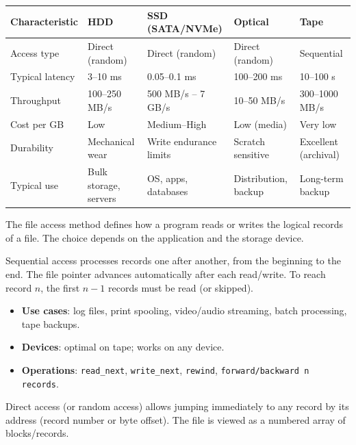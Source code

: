 \documentclass[11pt]{article}
\newcommand{\cle}[1]{{\popxbold\color{popdark}#1}}
\newcounter{popsec}
\newcounter{popsub}
\newcommand{\courssub}[1]{%
  \stepcounter{popsub}%
  \par\vspace{9pt}\noindent{\popxbold\fontsize{11.5}{13}\selectfont\color{popink}{\color{poporange}\thepopsec.\thepopsub}\hspace{6pt}#1}\par\nopagebreak\vspace{4pt}
}
\begin{document}
\begin{center}
\begin{tabularx}{\linewidth}{|l|X|X|X|X|}
\hline
\rowcolor{popblueL} \textbf{Characteristic} & \textbf{HDD} & \textbf{SSD (SATA/NVMe)} & \textbf{Optical} & \textbf{Tape} \\
\hline
Access type & Direct (random) & Direct (random) & Direct (random) & Sequential \\
\hline
Typical latency & 3–10 ms & 0.05–0.1 ms & 100–200 ms & 10–100 s \\
\hline
Throughput & 100–250 MB/s & 500 MB/s – 7 GB/s & 10–50 MB/s & 300–1000 MB/s \\
\hline
Cost per GB & Low & Medium–High & Low (media) & Very low \\
\hline
Durability & Mechanical wear & Write endurance limits & Scratch sensitive & Excellent (archival) \\
\hline
Typical use & Bulk storage, servers & OS, apps, databases & Distribution, backup & Long-term backup \\
\hline
\end{tabularx}
\end{center}

\courssub{File Access Methods}

The \cle{file access method} defines how a program reads or writes the logical records of a file. The choice depends on the application and the storage device.

\begin{definition}
\cle{Sequential access} processes records one after another, from the beginning to the end. The file pointer advances automatically after each read/write. To reach record $n$, the first $n-1$ records must be read (or skipped).
\end{definition}

\begin{itemize}
\item \textbf{Use cases}: log files, print spooling, video/audio streaming, batch processing, tape backups.
\item \textbf{Devices}: optimal on tape; works on any device.
\item \textbf{Operations}: \texttt{read\_next}, \texttt{write\_next}, \texttt{rewind}, \texttt{forward/backward n records}.
\end{itemize}

\begin{definition}
\cle{Direct access} (or \cle{random access}) allows jumping immediately to any record by its address (record number or byte offset). The file is viewed as a numbered array of blocks/records.
\end{definition}
\end{document}
